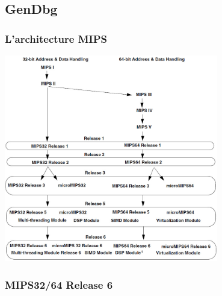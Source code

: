 \documentclass[11pt]{beamer}
\begin{document}
		\subsection*{GenDbg}
			\begin{frame}\label{architecturemips}
				\frametitle{L'architecture MIPS}
				\centering\includegraphics[width=0.7\textwidth]{MIPS_Architecture_Evolution}
			\end{frame}
			\begin{frame}
				\frametitle{MIPS32/64 Release 6}
				\centering{}\\
				\centering{}
			\end{frame}
\end{document}
